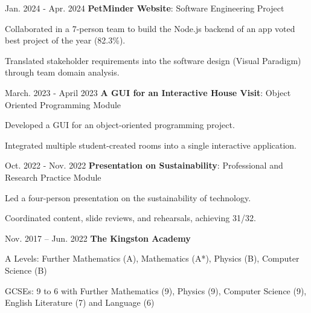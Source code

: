     \vspace{0.18cm}
    \begin{twocolentry}{
        Jan. 2024 - Apr. 2024
    }
        \textbf{PetMinder Website}: Software Engineering Project
    \end{twocolentry}
    \begin{highlights}
        \item Collaborated in a 7-person team to build the Node.js backend of an app voted best project of the year (82.3\%).
        \item Translated stakeholder requirements into the software design (Visual Paradigm) through team domain analysis.
    \end{highlights}

\vspace{0.1cm}
\begin{twocolentry}
    {March. 2023 - April 2023}
    \textbf{A GUI for an Interactive House Visit}: Object Oriented Programming Module 
\end{twocolentry}
\begin{highlights}
    \item Developed a GUI for an object-oriented programming project. 
    \item Integrated multiple student-created rooms into a single interactive application. 
\end{highlights}

\vspace{0.1cm}
\begin{twocolentry}
    {Oct. 2022 - Nov. 2022}
    \textbf{Presentation on Sustainability}: Professional and Research Practice Module
\end{twocolentry}
\begin{highlights}
    \item Led a four-person presentation on the sustainability of technology. 
    \item Coordinated content, slide reviews, and rehearsals, achieving 31/32.
\end{highlights}

\vspace{0.2cm}
\begin{twocolentry}
    {Nov. 2017 – Jun. 2022}
    \textbf{The Kingston Academy}
\end{twocolentry}
\begin{onecolentry}
    \begin{highlights}
        \item A Levels: Further Mathematics (A), Mathematics (A*), Physics (B), Computer Science (B)
        \item GCSEs: 9 to 6 with Further Mathematics (9), Physics (9), Computer Science (9), English Literature (7) and Language (6)
    \end{highlights}
\end{onecolentry}